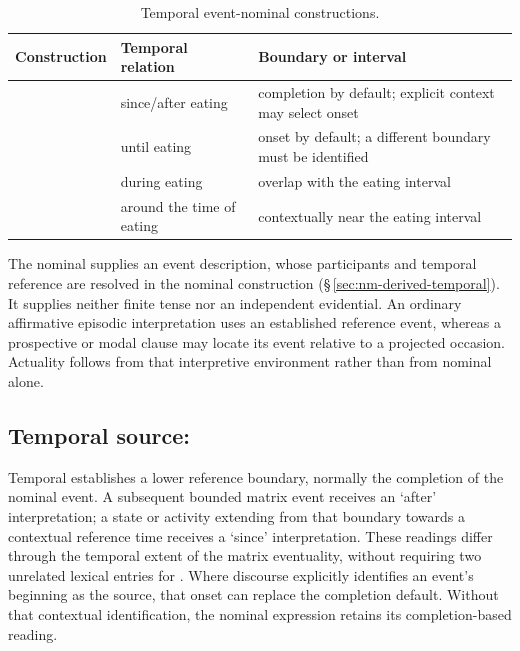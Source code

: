 \begin{table}[ht]
\footnotesize
\caption{Temporal event-nominal constructions.}\label{tab:tempconverbs}
\begin{tabularx}{\textwidth}{l L L}
\toprule
Construction & Temporal relation & Boundary or interval \\
\midrule
{} & since/after eating & completion by default; explicit context may select onset \\
 & until eating & onset by default; a different boundary must be identified \\
 & during eating & overlap with the eating interval \\
 & around the time of eating & contextually near the eating interval \\
\bottomrule
\end{tabularx}
\end{table}

The nominal supplies an event description, whose participants and temporal
reference are resolved in the nominal construction
(§\,\ref{sec:nm-derived-temporal}). It supplies neither finite tense nor an
independent evidential. An ordinary affirmative episodic interpretation uses
an established reference event, whereas a prospective or modal clause may
locate its event relative to a projected occasion. Actuality follows from that
interpretive environment rather than from nominal  alone.

\subsection{Temporal source: }

Temporal  establishes a lower reference boundary, normally the
completion of the nominal event. A subsequent bounded matrix event receives
an `after' interpretation; a state or activity extending from that boundary
towards a contextual reference time receives a `since' interpretation. These
readings differ through the temporal extent of the matrix eventuality, without
requiring two unrelated lexical entries for . Where discourse explicitly
identifies an event's beginning as the source, that onset can replace the
completion default. Without that contextual identification, the nominal
expression retains its completion-based reading.


